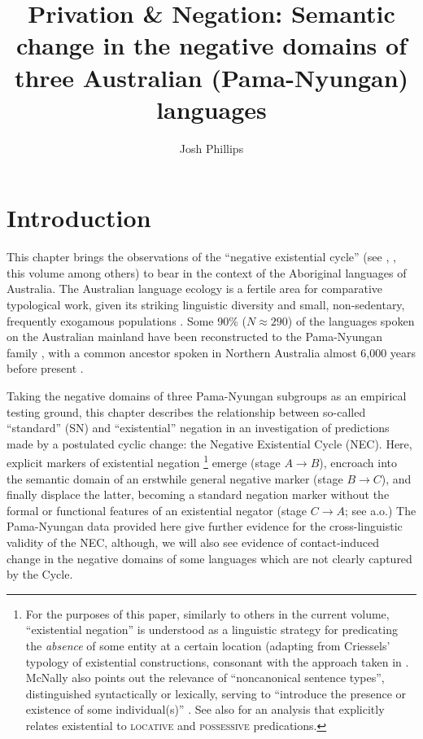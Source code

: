 \documentclass[output=paper]{langsci/langscibook}
\title{Privation \& Negation: Semantic change in the negative domains of three Australian (Pama-Nyungan) languages}
\author{Josh Phillips\affiliation{Yale University}}
\begin{document}
\section{Introduction}\label{sec:austr-1}

This chapter brings the observations of the ``negative existential cycle''
(see \citealt{Croft1991}, \citealt{Veselinova2013,Veselinova2016}, this
volume among others) to bear in the context of the Aboriginal languages of
Australia. The Australian language ecology is a fertile area for
comparative typological work, given its striking linguistic diversity and
small, non-sedentary, frequently exogamous populations \citep{Bowern2010}.
Some 90\% ($N\approx290$) of the languages spoken on the Australian
mainland have been reconstructed to the Pama-Nyungan family \parencites(see
also)(){OVV1966}{Wurm1972}{BowernAtkinson2012}, with a common ancestor spoken in Northern Australia almost 6,000 years before present \citep{BouckaertBowern2018}.

Taking the negative domains of three Pama-Nyungan subgroups as an empirical
testing ground, this chapter describes the relationship between
so-called ``standard'' (SN) and ``existential'' negation in an
investigation of predictions made by a postulated cyclic change: the
Negative Existential Cycle (NEC). Here, explicit markers of existential
negation%
    \footnote{For the purposes of this paper, similarly to others in the current volume, ``existential negation'' is understood as a linguistic strategy for predicating the \textit{absence} of some entity at a certain location (adapting from Criessels' \citeyearpar[2]{Creissels2014} typology of existential constructions, consonant with the approach taken in \citealp[139]{Veselinova2013}. McNally also points out the relevance of ``noncanonical sentence types'', distinguished syntactically or lexically, serving to ``introduce the presence or existence of some individual(s)'' \citeyearpar[210]{McNally2016}. See also \citealt{Freeze1992} for an analysis that explicitly relates existential to \textsc{locative} and \textsc{possessive} predications.} 
%
emerge (stage $A\to B$), encroach into the semantic domain of an erstwhile general negative marker (stage $B\to C$), and finally displace the latter, becoming a standard negation marker without the formal or functional features of an existential negator (stage $C\to A$; see \citealt{Croft1991,Veselinova2016} a.o.) The Pama-Nyungan data provided here give further evidence for the cross-linguistic validity of the NEC, although, we will also see evidence of contact-induced change in the negative domains of some languages which are not clearly captured by the Cycle.
\end{document}
